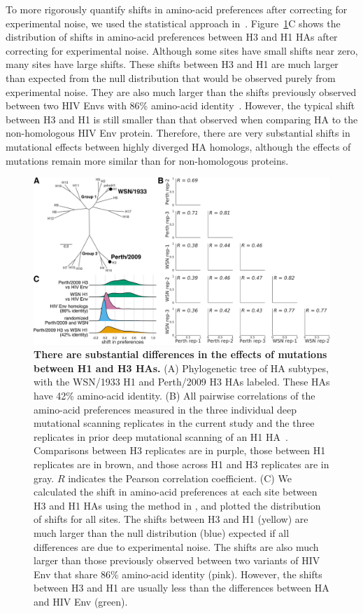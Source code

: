 \documentclass[9pt,twocolumn,twoside]{pnas-new}
\begin{document}
To more rigorously quantify shifts in amino-acid preferences after correcting for experimental noise, we used the statistical approach in~\cite{doud2015site,haddox2018mapping}.
Figure~\ref{fig:distance_distribution}C shows the distribution of shifts in amino-acid preferences between H3 and H1 HAs after correcting for experimental noise.
Although some sites have small shifts near zero, many sites have large shifts.
These shifts between H3 and H1 are much larger than expected from the null distribution that would be observed purely from experimental noise.
They are also much larger than the shifts previously observed between two HIV Envs with 86\% amino-acid identity~\cite{haddox2018mapping}.
However, the typical shift between H3 and H1 is still smaller than that observed when comparing HA to the non-homologous HIV Env protein.
Therefore, there are very substantial shifts in mutational effects between highly diverged HA homologs, although the effects of mutations remain more similar than for non-homologous proteins.

\begin{figure}
\centering
\includegraphics[width=12cm]{figs/distance_distribution/distance_distribution.pdf}
\caption{\label{fig:distance_distribution}
{\bf There are substantial differences in the effects of mutations between H1 and H3 HAs.}
(A) Phylogenetic tree of HA subtypes, with the WSN/1933 H1 and Perth/2009 H3 HAs labeled.
These HAs have 42\% amino-acid identity.
(B) All pairwise correlations of the amino-acid preferences measured in the three individual deep mutational scanning replicates in the current study  and the three replicates in prior deep mutational scanning of an H1 HA~\cite{doud2016accurate}.
Comparisons between H3 replicates are in purple, those between H1 replicates are in brown, and those across H1 and H3 replicates are in gray.
$R$ indicates the Pearson correlation coefficient.
(C) We calculated the shift in amino-acid preferences at each site between H3 and H1 HAs using the method in \cite{haddox2018mapping}, and plotted the distribution of shifts for all sites.
The shifts between H3 and H1 (yellow) are much larger than the null distribution (blue) expected if all differences are due to experimental noise.
The shifts are also much larger than those previously observed between two variants of HIV Env that share 86\% amino-acid identity (pink).
However, the shifts between H3 and H1 are usually less than the differences between HA and HIV Env (green).
}
\end{figure}
\end{document}
